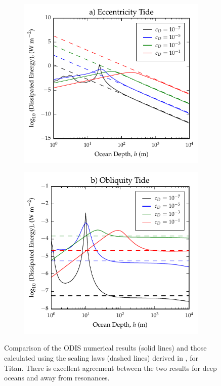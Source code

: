 \begin{figure}[!t]
\centering
\begin{subfigure}{0.5\linewidth}
\centering
\includegraphics[width=\linewidth]{Figures/Eccentricity_scaling}
\subcaption{\label{fig:scalEccTitan}}
\end{subfigure}%
\begin{subfigure}{0.5\linewidth}
\centering
\includegraphics[width=\linewidth]{Figures/Obliquity_scaling}
\subcaption{\label{fig:scalObliqTitan}}
\end{subfigure}
\vspace*{-0.8cm}
\caption{Comparison of the ODIS numerical results (solid lines) and those calculated using the scaling laws (dashed lines) derived in \citet{chen2013tidal}, for Titan. There is excellent agreement between the two results for deep oceans and away from resonances. \label{fig:scalTitan}}
\end{figure}

